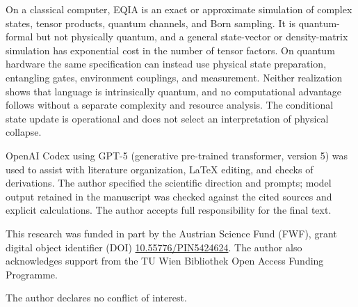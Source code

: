 \documentclass[
  aps,
  reprint,
  superscriptaddress,
  floatfix,
  nofootinbib,
  longbibliography
]{revtex4-2}
\begin{document}
On a classical computer, EQIA is an exact or approximate simulation of
complex states, tensor products, quantum channels, and Born sampling.  It is
quantum-formal but not physically quantum, and a general state-vector or
density-matrix simulation has exponential cost in the number of tensor
factors.  On quantum hardware the same specification can instead use physical
state preparation, entangling gates, environment couplings, and measurement.
Neither realization shows that language is intrinsically quantum, and no
computational advantage follows without a separate complexity and resource
analysis.  The conditional state update is operational and does not select an
interpretation of physical collapse.


\begin{acknowledgments}
OpenAI Codex using GPT-5 (generative pre-trained transformer, version 5) was
used to assist with literature organization, \LaTeX{}
editing, and checks of derivations.  The author specified the scientific
direction and prompts; model output retained in the manuscript was checked
against the cited sources and explicit calculations.  The author accepts full
responsibility for the final text.

This research was funded in part by the Austrian Science Fund (FWF), grant
digital object identifier (DOI)
\href{https://doi.org/10.55776/PIN5424624}{10.55776/PIN5424624}.
The author also acknowledges support from the TU Wien Bibliothek Open Access
Funding Programme.

The author declares no conflict of interest.
\end{acknowledgments}


\end{document}
